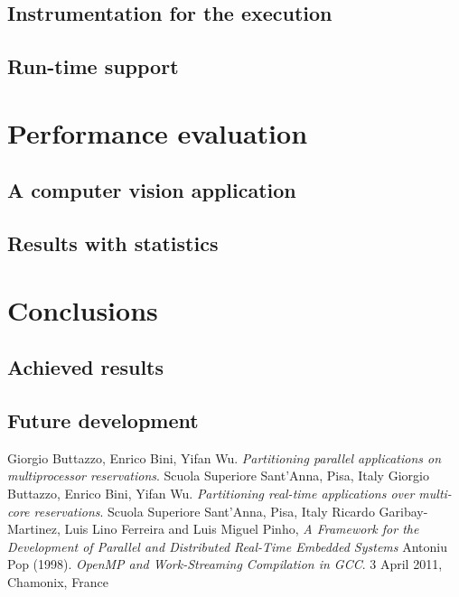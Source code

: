 \documentclass[a4paper,11pt,oneside]{book}
\begin{document}
\section{Instrumentation for the execution}
\section{Run-time support}

\chapter{Performance evaluation}
\section{A computer vision application}
\section{Results with statistics}

\chapter{Conclusions}
\section{Achieved results}
\section{Future development}

\begin{thebibliography}{9}
 Giorgio Buttazzo, Enrico Bini, Yifan Wu. \emph{Partitioning parallel applications on multiprocessor reservations}. Scuola Superiore Sant’Anna, Pisa, Italy
 Giorgio Buttazzo, Enrico Bini, Yifan Wu. \emph{Partitioning real-time applications over multi-core reservations}. Scuola Superiore Sant’Anna, Pisa, Italy
 Ricardo Garibay-Martinez, Luis Lino Ferreira and Luis Miguel Pinho, \emph{A Framework for the Development of Parallel and Distributed Real-Time Embedded Systems}
Antoniu Pop (1998). \emph{OpenMP and Work-Streaming Compilation in GCC}. 3 April 2011, Chamonix, France

\end{thebibliography}
\end{document}
